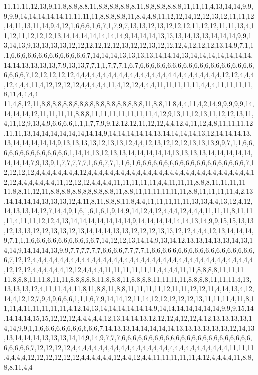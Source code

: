11,11,11,12,13,9,11,8,8,8,8,8,11,8,8,8,8,8,8,8,11,8,8,8,8,8,8,8,11,11,11,4,13,14,14,9,9,9,9,9,14,14,14,14,14,11,11,11,11,8,8,8,8,8,11,8,4,4,8,11,12,12,14,12,12,13,12,11,11,12,14,11,13,11,14,9,4,12,1,6,6,6,1,6,7,1,7,9,7,13,13,12,13,12,12,12,11,12,12,11,11,13,4,11,12,11,12,12,12,13,14,14,14,14,14,14,14,9,14,14,14,13,13,13,14,13,13,14,14,14,9,9,13,14,13,9,13,13,13,13,12,12,12,12,12,12,13,12,12,13,12,12,12,4,12,12,12,13,14,9,7,1,1,1,6,6,6,6,6,6,6,6,6,6,6,6,6,6,7,14,14,14,13,13,13,13,14,14,14,13,14,14,14,14,14,14,14,14,14,13,13,13,13,7,9,13,13,7,7,1,1,7,7,7,1,6,7,6,6,6,6,6,6,6,6,6,6,6,6,6,6,6,6,6,6,6,6,6,6,6,6,6,7,12,12,12,12,12,4,4,4,4,4,4,4,4,4,4,4,4,4,4,4,4,4,4,4,4,4,4,4,4,4,4,4,12,12,4,4,4,12,4,4,4,11,4,12,12,12,12,4,4,4,4,4,11,4,12,12,4,4,4,11,11,11,11,11,4,4,4,11,11,11,11,8,11,4,4,4,4
11,4,8,12,11,8,8,8,8,8,8,8,8,8,8,8,8,8,8,8,8,8,8,8,11,8,8,11,8,4,4,11,4,2,14,9,9,9,9,9,14,14,14,14,12,11,11,11,11,8,8,8,11,11,11,11,11,11,11,4,12,9,13,11,12,13,11,12,12,13,11,4,11,12,9,13,4,9,6,6,6,6,1,1,1,7,7,9,9,12,12,12,11,12,12,4,4,12,4,11,12,4,8,11,11,11,12,11,11,13,14,14,14,14,14,14,14,14,9,14,14,14,14,14,13,14,14,14,14,13,12,14,14,14,13,13,14,14,14,14,14,9,13,13,13,13,12,13,13,12,4,4,12,13,12,12,12,13,13,13,9,9,7,1,1,6,6,6,6,6,6,6,6,6,6,6,6,6,6,1,14,14,13,12,13,13,14,14,14,14,14,13,13,13,13,14,14,14,14,14,14,14,14,7,9,13,9,1,7,7,7,7,7,1,6,6,7,7,1,1,6,1,6,6,6,6,6,6,6,6,6,6,6,6,6,6,6,6,6,6,6,6,7,12,12,12,12,4,4,4,4,4,4,4,4,12,4,4,4,4,4,4,4,4,4,4,4,4,4,4,4,4,4,4,4,4,4,4,4,4,4,4,4,4,4,4,12,12,4,4,4,4,4,4,4,11,12,12,12,4,4,4,4,11,11,11,11,11,4,4,11,11,11,8,8,8,11,11,11,11
11,8,8,11,12,11,8,8,8,8,8,8,8,8,8,8,8,8,11,8,8,11,11,11,11,11,11,8,8,11,11,11,11,4,2,13,14,14,14,14,13,13,13,12,4,11,8,11,8,8,8,11,8,4,4,11,11,11,11,11,13,13,4,4,13,12,4,12,14,13,13,14,12,7,14,4,9,1,6,1,6,1,6,1,9,14,9,14,12,4,12,4,4,4,12,4,4,4,11,11,11,8,11,11,11,4,11,11,12,12,4,13,14,14,14,14,14,14,14,9,14,14,14,14,14,14,13,14,9,9,15,15,13,13,12,13,13,12,12,13,13,12,13,14,14,14,13,13,12,12,12,13,13,12,12,4,4,4,12,13,14,14,14,9,7,1,1,1,6,6,6,6,6,6,6,6,6,6,6,6,7,14,12,12,13,14,14,9,13,14,12,13,13,14,13,13,14,13,14,14,9,14,14,14,13,9,9,7,7,7,7,7,7,6,6,6,6,7,7,7,7,1,6,6,6,6,6,6,6,6,6,6,6,6,6,6,6,6,6,6,6,6,7,12,12,4,4,4,4,4,4,4,4,4,4,4,4,4,4,4,4,4,4,4,4,4,4,4,4,4,4,4,4,4,4,4,4,4,4,4,4,4,4,4,4,4,12,12,12,4,4,4,4,4,4,12,12,4,4,4,4,11,11,11,11,11,11,4,4,4,4,11,11,8,8,8,8,11,11,11
11,8,8,8,11,11,8,11,11,8,8,8,8,8,11,8,8,8,11,8,8,8,8,11,11,11,11,8,8,8,8,11,11,11,4,13,13,13,13,12,4,11,11,4,4,11,8,11,8,8,11,8,8,11,11,11,11,12,11,11,12,12,11,4,14,13,4,12,14,4,12,12,7,9,4,9,6,6,6,1,1,1,6,7,9,14,14,12,11,14,12,12,12,12,12,13,11,11,11,4,11,8,11,11,4,11,11,11,11,11,4,12,14,13,14,14,14,14,14,14,9,14,14,14,14,14,14,14,9,9,9,15,14,14,14,14,15,15,12,12,12,4,4,4,4,4,12,13,14,14,13,12,12,12,4,12,12,4,12,13,13,13,13,14,14,9,9,1,1,6,6,6,6,6,6,6,6,6,6,6,7,14,13,13,14,14,14,14,14,13,13,13,13,13,13,12,14,13,13,14,14,14,13,13,13,14,14,9,14,9,7,7,7,6,6,6,6,6,6,6,6,6,6,6,6,6,6,6,6,6,6,6,6,6,6,6,6,6,6,6,6,6,7,12,12,12,12,4,4,4,4,4,4,4,4,4,4,4,4,4,4,4,4,4,4,4,4,4,4,4,4,4,4,4,4,4,11,11,11,4,4,4,4,12,12,12,12,12,12,4,4,4,4,4,4,12,4,4,12,4,4,11,11,11,11,11,4,12,4,4,4,4,11,8,8,8,8,11,4,4
